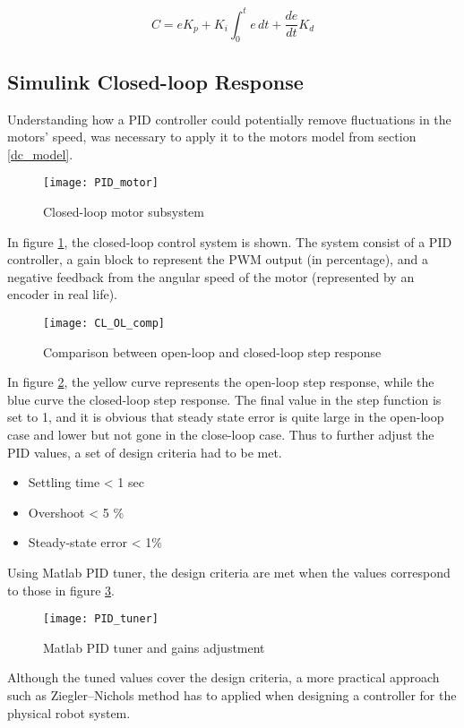\begin{equation}
C = eK_p + K_i\int_{0}^{t} e \,dt + \frac{de}{dt}K_d
\end{equation} 

\subsection{Simulink Closed-loop Response} 

Understanding how a PID controller could potentially remove fluctuations in the motors' speed, was necessary to apply it to the motors model from section \ref{dc_model}. 

\begin{figure}[h]
\centering
\texttt{[image: PID\_motor]}
\caption{Closed-loop motor subsystem}
\label{fig::PID_motor}
\end{figure}

In figure \ref{fig::PID_motor}, the closed-loop control system is shown. The system consist of a PID controller, a gain block to represent the PWM output (in percentage), and a negative feedback from the angular speed of the motor (represented by an encoder in real life). 

\begin{figure}[h]
\centering
\texttt{[image: CL\_OL\_comp]}
\caption{Comparison between open-loop and closed-loop step response}
\label{fig::PID_comp}
\end{figure}

In figure \ref{fig::PID_comp}, the yellow curve represents the open-loop step response, while the blue curve the closed-loop step response. The final value in the step function is set to 1, and it is obvious that steady state error is quite large in the open-loop case and lower but not gone in the close-loop case. Thus to further adjust the PID values, a set of design criteria had to be met.

\begin{itemize}
\item Settling time < 1 sec
\item Overshoot < 5 \%
\item Steady-state error < 1\%
\end{itemize} 

Using Matlab PID tuner, the design criteria are met when the values correspond to those in figure \ref{fig::PID_tuner}.

\begin{figure}[h]
\centering
\texttt{[image: PID\_tuner]}
\caption{Matlab PID tuner and gains adjustment}
\label{fig::PID_tuner}
\end{figure}

Although the tuned values cover the design criteria, a more practical approach such as Ziegler–Nichols method has to applied when designing a controller for the physical robot system. 